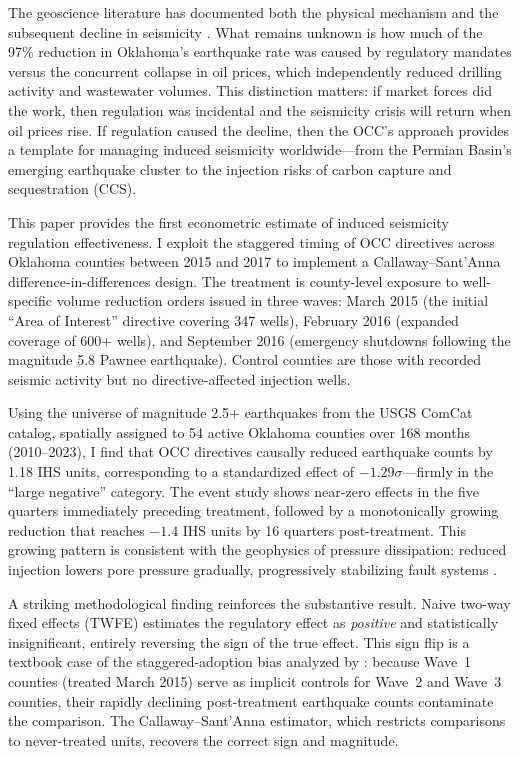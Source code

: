 \documentclass[12pt]{article}
\begin{document}
The geoscience literature has documented both the physical mechanism and the subsequent decline in seismicity \citep{langenbruch2018responsible, mcgarr2014maximum, mcnamara2015earthquake}. What remains unknown is how much of the 97\% reduction in Oklahoma's earthquake rate was caused by regulatory mandates versus the concurrent collapse in oil prices, which independently reduced drilling activity and wastewater volumes. This distinction matters: if market forces did the work, then regulation was incidental and the seismicity crisis will return when oil prices rise. If regulation caused the decline, then the OCC's approach provides a template for managing induced seismicity worldwide---from the Permian Basin's emerging earthquake cluster to the injection risks of carbon capture and sequestration (CCS).

This paper provides the first econometric estimate of induced seismicity regulation effectiveness. I exploit the staggered timing of OCC directives across Oklahoma counties between 2015 and 2017 to implement a Callaway--Sant'Anna \citeyearpar{callaway2021difference} difference-in-differences design. The treatment is county-level exposure to well-specific volume reduction orders issued in three waves: March 2015 (the initial ``Area of Interest'' directive covering 347 wells), February 2016 (expanded coverage of 600+ wells), and September 2016 (emergency shutdowns following the magnitude 5.8 Pawnee earthquake). Control counties are those with recorded seismic activity but no directive-affected injection wells.

Using the universe of magnitude 2.5+ earthquakes from the USGS ComCat catalog, spatially assigned to 54 active Oklahoma counties over 168 months (2010--2023), I find that OCC directives causally reduced earthquake counts by 1.18 IHS units, corresponding to a standardized effect of $-1.29\sigma$---firmly in the ``large negative'' category. The event study shows near-zero effects in the five quarters immediately preceding treatment, followed by a monotonically growing reduction that reaches $-1.4$ IHS units by 16 quarters post-treatment. This growing pattern is consistent with the geophysics of pressure dissipation: reduced injection lowers pore pressure gradually, progressively stabilizing fault systems \citep{langenbruch2016will}.

A striking methodological finding reinforces the substantive result. Naive two-way fixed effects (TWFE) estimates the regulatory effect as \textit{positive} and statistically insignificant, entirely reversing the sign of the true effect. This sign flip is a textbook case of the staggered-adoption bias analyzed by \citet{goodmanbacon2021difference}: because Wave~1 counties (treated March 2015) serve as implicit controls for Wave~2 and Wave~3 counties, their rapidly declining post-treatment earthquake counts contaminate the comparison. The Callaway--Sant'Anna estimator, which restricts comparisons to never-treated units, recovers the correct sign and magnitude.
\end{document}
